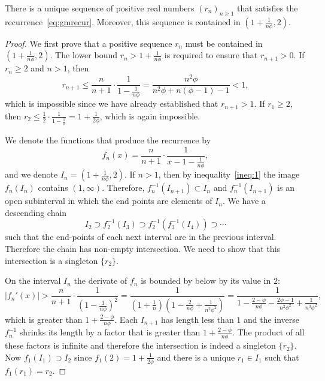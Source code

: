 \documentclass[12pt,reqno]{article}
\begin{document}
\begin{lemma}\label{lem:uniq}
There is a unique sequence of positive real numbers $(r_n)_{n \geq 1}$ that satisfies the recurrence~\ref{eq:gmrecur}.
Moreover, this sequence is contained in $(1+\frac 1{n\phi},2)$.
\end{lemma}
\begin{proof}
    We first prove that a positive sequence $r_n$ must be contained in $(1+\frac{1}{n\phi},2)$. 
    The lower bound $r_n>1+\frac 1{n\phi}$ is required to ensure that $r_{n+1}>0$.
    If $r_n\geq 2$ and $n>1$, then
    \begin{equation}\label{ineq:1}
    r_{n+1}\leq\frac{n}{n+1}\cdot \frac {1}{1-\frac{1}{n\phi}}=\frac{n^2\phi}{n^2\phi+n(\phi-1)-1}<1,
    \end{equation}
    which is impossible since we have already established that $r_{n+1}>1$. If $r_1\geq 2$, then
    $r_2\leq\frac 12\cdot \frac 1{1-\frac 1\phi}=1+\frac{1}{2\phi}$, which is again impossible.

    We denote the functions that produce the recurrence by \[f_n(x)=\frac{n}{n+1}\cdot \frac {1}{x-1-\frac{1}{n\phi}},\] 
    and we denote $I_n=(1+\frac 1{n\phi},2)$. 
    If $n>1$, then by inequality~\ref{ineq:1} the image $f_n(I_n)$ contains $(1,\infty)$. Therefore, $f_n^{-1}(I_{n+1})\subset I_n$ and $f_n^{-1}(I_{n+1})$ is an open subinterval in which the end points are elements of $I_n$.
    We have a descending chain
    \begin{equation}\label{eq:chain}
        I_2\supset f_2^{-1}(I_3)\supset f_2^{-1}(f_3^{-1}(I_4))\supset \cdots        
    \end{equation}
    such that the end-points of each next interval are in the previous interval. 
    Therefore the chain has non-empty intersection. We need to show that this intersection is a singleton $\{r_2\}$.
    
    On the interval $I_n$ the derivate of $f_n$ is bounded by below by its value in $2$: 
    \[
    |f_n'(x)|>\frac {n}{n+1}\cdot\frac{1}{\left(1-\frac 1{n\phi}\right)^2}=\frac{1}{(1+\frac 1n)(1-\frac {2}{n\phi}+\frac 1{n^2\phi^2})}=\frac 1{1-\frac{2-\phi}{n\phi}-\frac {2\phi-1}{n^2\phi^2}+\frac 1{n^3\phi^2}},\] 
    which is greater than $1+\frac{2-\phi}{n\phi}$. Each $I_{n+1}$ has length less than $1$ and the inverse
    $f_n^{-1}$ shrinks its length by a factor that is greater than $1+\frac{2-\phi}{n\phi}$. The product
    of all these factors is infinite and therefore the intersection is indeed a singleton $\{r_2\}$.
    Now $f_1(I_1)\supset I_2$ since $f_1(2)=1+\frac 1{2\phi}$ 
    and there is a unique $r_1\in I_1$ such that $f_1(r_1)=r_2$.
\end{proof}
\end{document}
